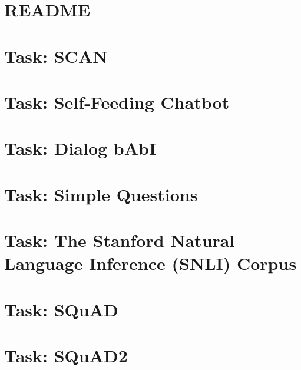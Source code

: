 \documentclass[twoside]{book}
\newcommand{\+}{\discretionary{\mbox{\scriptsize$\hookleftarrow$}}{}{}}
\begin{document}
\chapter{R\+E\+A\+D\+ME}
\label{md_parlai_tasks_README}

\chapter{Task\+: S\+C\+AN}
\label{md_parlai_tasks_scan_README}

\chapter{Task\+: Self-\/\+Feeding Chatbot}
\label{md_parlai_tasks_self_feeding_README}

\chapter{Task\+: Dialog b\+AbI}
\label{md_parlai_tasks_shadock_README}

\chapter{Task\+: Simple Questions}
\label{md_parlai_tasks_simplequestions_README}

\chapter{Task\+: The Stanford Natural Language Inference (S\+N\+LI) Corpus}
\label{md_parlai_tasks_snli_README}

\chapter{Task\+: S\+Qu\+AD}
\label{md_parlai_tasks_squad_README}

\chapter{Task\+: S\+Qu\+A\+D2}
\label{md_parlai_tasks_squad2_README}

\end{document}
